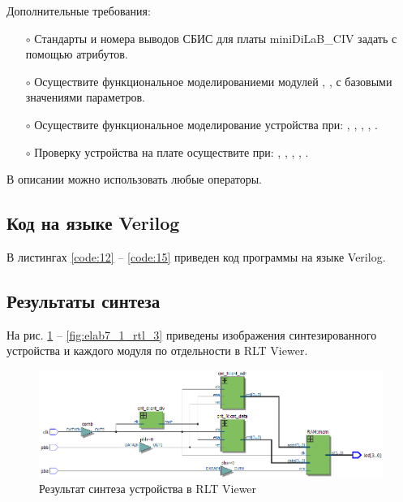 Дополнительные требования:
\begin{itemize}
	\item[$\circ$] Стандарты и номера выводов СБИС для платы miniDiLaB\_CIV задать с помощью атрибутов.
	\item[$\circ$] Осуществите функциональное моделированиеми  модулей , ,  с базовыми значениями параметров.
	\item[$\circ$] Осуществите функциональное моделирование устройства при: , , , , .
	\item[$\circ$] Проверку устройства на плате осуществите при: , , , , .
\end{itemize}
В описании можно использовать любые операторы.

\newpage

\subsection{Код на языке Verilog}

В листингах \ref{code:12} -- \ref{code:15} приведен код программы на языке Verilog.



\newpage





\newpage



\newpage

\subsection{Результаты синтеза}

На рис. \ref{fig:elab7_1_rtl} -- \ref{fig:elab7_1_rtl_3} приведены изображения синтезированного устройства и каждого модуля по отдельности в RLT Viewer.

\begin{figure}[H]
\begin{center}
	\includegraphics[width=\textwidth]{elab7_1_rtl}
	\caption{Результат синтеза устройства в RLT Viewer}
	\label{fig:elab7_1_rtl}
\end{center}
\end{figure}

